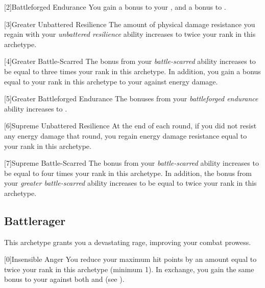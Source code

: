        [2]{Battleforged Endurance} You gain a  bonus to your , and a  bonus to .

        [3]{Greater Unbattered Resilience} The amount of physical damage resistance you regain with your \textit{unbattered resilience} ability increases to twice your rank in this archetype.

        [4]{Greater Battle-Scarred} The bonus from your \textit{battle-scarred} ability increases to be equal to three times your rank in this archetype.
        In addition, you gain a bonus equal to your rank in this archetype to your  against energy damage.

        [5]{Greater Battleforged Endurance} The bonuses from your \textit{battleforged endurance} ability increases to .

        [6]{Supreme Unbattered Resilience} At the end of each round, if you did not resist any energy damage that round, you regain energy damage resistance equal to your rank in this archetype.

        [7]{Supreme Battle-Scarred} The bonus from your \textit{battle-scarred} ability increases to be equal to four times your rank in this archetype.
        In addition, the bonus from your \textit{greater battle-scarred} ability increases to be equal to twice your rank in this archetype.

    \newpage
    \subsection{Battlerager}\label{Rage}
        This archetype grants you a devastating rage, improving your combat prowess.

        [0]{Insensible Anger} You reduce your maximum hit points by an amount equal to twice your rank in this archetype (minimum 1).
        In exchange, you gain the same bonus to your  against both  and  (see ).

